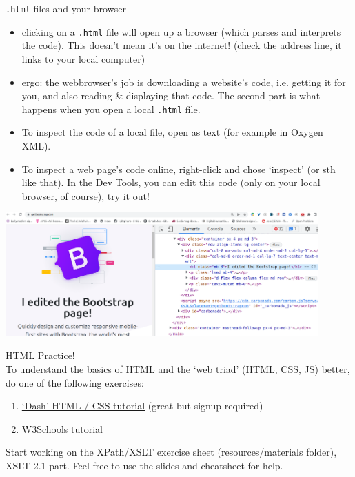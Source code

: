 \begin{frame}{\texttt{.html} files and your browser}
    \footnotesize{}
\begin{itemize}
    \item clicking on a \texttt{.html} file will open up a browser (which parses and interprets the code). This doesn't mean it's on the internet! (check the address line, it links to your local computer)
    \item ergo: the webbrowser's job is downloading a website's code, i.e. getting it for you, and also reading \& displaying that code. The second part is what happens when you open a local \texttt{.html} file.
    \item To inspect the code of a local file, open as text (for example in Oxygen XML).
    \item To inspect a web page's code online, right-click and chose `inspect' (or sth like that). In the Dev Tools, you can edit this code (only on your local browser, of course), try it out!
\end{itemize}

\begin{block}{}
\includegraphics[width=0.9\textwidth]{img/bootstrap-dev-tools.png}
\end{block}

\end{frame}



\begin{frame}[standout]
    \alert{HTML Practice!} \\
    \normalsize
    To understand the basics of HTML and the `web triad' (HTML, CSS, JS) better, do one of the following exercises:
    \begin{enumerate}
        \item \alert{\href{https://dash.generalassemb.ly/}{`Dash' HTML / CSS tutorial}} (great but signup required)
        \item \alert{\href{https://www.w3schools.com/html/default.asp}{W3Schools tutorial}}
    \end{enumerate}
    
    Start working on the XPath/XSLT exercise sheet (resources/materials folder), XSLT 2.1 part. Feel free to use the slides and cheatsheet for help.
\end{frame}
